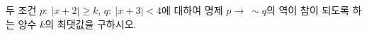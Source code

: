 두 조건 $p:\ |x+2|\ge k$, $q:\ |x+3|<4$에 대하여 명제 $p\longrightarrow\ \sim q$의 역이 참이 되도록 하는 양수 $k$의 최댓값을 구하시오.
